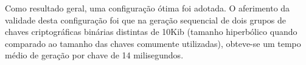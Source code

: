 \documentclass[12pt]{article}
\begin{document}
        
        Como resultado geral, uma configuração ótima foi adotada. O aferimento da validade desta configuração foi que na geração sequencial de dois grupos de chaves criptográficas binárias distintas de 10Kib (tamanho hiperbólico quando comparado ao tamanho das chaves comumente utilizadas), obteve-se um tempo médio de geração por chave de 14 milisegundos.
        
        

        
\end{document}

